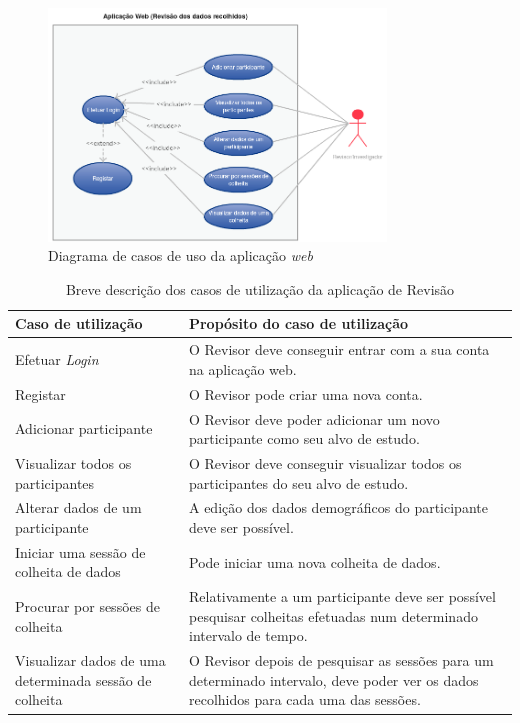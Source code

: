 \begin{figure}[H]
  \centering
  \includegraphics[width=0.8\textwidth]{imgs/app-web-usecase.png}
  \caption[Diagrama de casos de uso da aplicação \textit{web}]{Diagrama de casos de uso da aplicação \textit{web}}
  
  \label{f:usecasewebapp}
\end{figure}



\begin{table}[H]
\centering
\label{t:web-usecase}
\begin{tabularx}{1\textwidth}{|p{4cm}|p{10.7cm}|}
\rowcolor[HTML]{FFCE93} \hline
{\color[HTML]{000000} \textbf{Caso de utilização}} & {\color[HTML]{000000} \textbf{Propósito do caso de utilização}}  \\
\hline
Efetuar \textit{Login} & O Revisor deve conseguir entrar com a sua conta na aplicação web. \\ \hline

Registar & O Revisor pode criar uma nova  conta. \\ \hline

Adicionar participante & O Revisor deve poder adicionar um novo participante como seu alvo de estudo.\\ \hline

Visualizar todos os participantes & O Revisor deve conseguir visualizar todos os participantes do seu alvo de estudo. \\ \hline

Alterar dados de um participante & A edição dos dados demográficos do participante deve ser possível. \\ \hline

Iniciar uma sessão de colheita de dados  & Pode iniciar uma nova colheita de dados. \\ \hline

Procurar por sessões de colheita & Relativamente a um participante deve ser possível  pesquisar colheitas efetuadas num determinado intervalo de tempo. \\ \hline

Visualizar dados de uma determinada sessão de colheita & O Revisor depois de pesquisar as sessões para um determinado intervalo, deve poder ver os dados recolhidos para cada uma das sessões. \\ \hline                        
\end{tabularx}
\caption{Breve descrição dos casos de utilização da aplicação de Revisão}
\end{table}

\cleardoublepage